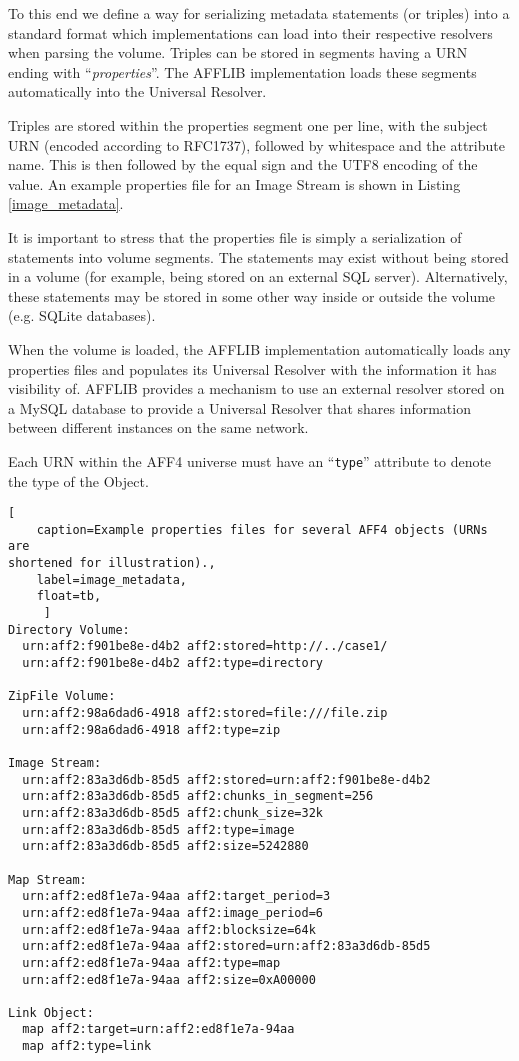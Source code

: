 \documentclass[10pt, conference]{IEEEtran}
\begin{document}
To this end we define a way for serializing metadata statements (or
triples) into a standard format which implementations can load into
their respective resolvers when parsing the volume. Triples can be
stored in segments having a URN ending with ``{\em properties}''. The
AFFLIB implementation loads these segments automatically into the
Universal Resolver. 

Triples are stored within the properties segment one per line, with
the subject URN (encoded according to RFC1737), followed by whitespace
and the attribute name. This is then followed by the equal sign and
the UTF8 encoding of the value. An example properties file for an
Image Stream is shown in Listing \ref{image_metadata}.

It is important to stress that the properties file is simply a
serialization of statements into volume segments. The statements may
exist without being stored in a volume (for example, being stored on
an external SQL server). Alternatively, these statements may be stored
in some other way inside or outside the volume (e.g. SQLite
databases).

When the volume is loaded, the AFFLIB implementation automatically
loads any properties files and populates its Universal Resolver with
the information it has visibility of. AFFLIB provides a mechanism to
use an external resolver stored on a MySQL database to provide a
Universal Resolver that shares information between different instances
on the same network.

Each URN within the AFF4 universe must have an ``\texttt{type}''
attribute to denote the type of the Object.

\begin{lstlisting}[
	caption=Example properties files for several AFF4 objects (URNs are
shortened for illustration).,
	label=image_metadata,
	float=tb,
	 ]
Directory Volume:
  urn:aff2:f901be8e-d4b2 aff2:stored=http://../case1/
  urn:aff2:f901be8e-d4b2 aff2:type=directory

ZipFile Volume:
  urn:aff2:98a6dad6-4918 aff2:stored=file:///file.zip
  urn:aff2:98a6dad6-4918 aff2:type=zip

Image Stream:
  urn:aff2:83a3d6db-85d5 aff2:stored=urn:aff2:f901be8e-d4b2
  urn:aff2:83a3d6db-85d5 aff2:chunks_in_segment=256
  urn:aff2:83a3d6db-85d5 aff2:chunk_size=32k
  urn:aff2:83a3d6db-85d5 aff2:type=image
  urn:aff2:83a3d6db-85d5 aff2:size=5242880

Map Stream:
  urn:aff2:ed8f1e7a-94aa aff2:target_period=3
  urn:aff2:ed8f1e7a-94aa aff2:image_period=6
  urn:aff2:ed8f1e7a-94aa aff2:blocksize=64k
  urn:aff2:ed8f1e7a-94aa aff2:stored=urn:aff2:83a3d6db-85d5
  urn:aff2:ed8f1e7a-94aa aff2:type=map
  urn:aff2:ed8f1e7a-94aa aff2:size=0xA00000

Link Object:
  map aff2:target=urn:aff2:ed8f1e7a-94aa
  map aff2:type=link
\end{lstlisting}
\end{document}
